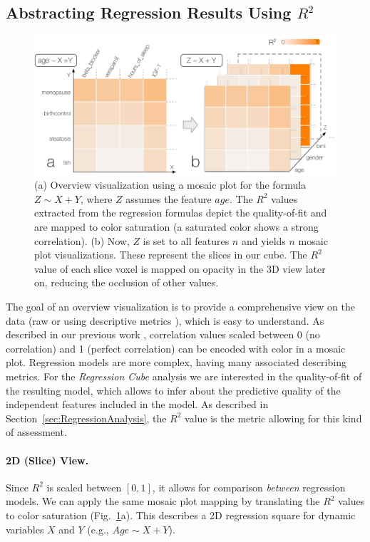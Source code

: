 \documentclass[journal]{style/vgtc} 			          %
\begin{document}
\subsection{Abstracting Regression Results Using $R^2$}
\begin{figure}[htb]
 \centering
 \includegraphics[width=1.0\linewidth]{figures/cube}
 \caption{
 (a) Overview visualization using a mosaic plot for the formula $Z \sim X + Y$, where $Z$ assumes the feature $age$.
 The $R^2$ values extracted from the regression formulas depict the quality-of-fit and are mapped to color saturation (a saturated color shows a strong correlation).
 (b) Now, $Z$ is set to all features $n$ and yields $n$ mosaic plot visualizations.
 These represent the slices in our cube.
 The $R^2$ value of each slice voxel is mapped on opacity in the 3D view later on, reducing the occlusion of other values.
 }
  \label{fig:Cube}
\end{figure}
The goal of an overview visualization is to provide a comprehensive view on the data (raw or using descriptive metrics \cite{Bertini}), which is easy to understand.
As described in our previous work \cite{Klemm2014VIS}, correlation values scaled between 0 (no correlation) and 1 (perfect correlation) can be encoded with color in a mosaic plot.
Regression models are more complex, having many associated describing metrics.
For the \emph{Regression Cube} analysis we are interested in the quality-of-fit of the resulting model, which allows to infer about the predictive quality of the independent features included in the model.
As described in Section~\ref{sec:RegressionAnalysis}, the $R^2$ value is the metric allowing for this kind of assessment.
\paragraph{2D (Slice) View.}
Since $R^2$ is scaled between $[0, 1]$, it allows for comparison \emph{between} regression models.
We can apply the same mosaic plot mapping by translating the $R^2$ values to color saturation (Fig.~\ref{fig:Cube}a).
This describes a 2D regression square for dynamic variables $X$ and $Y$ (e.g., $Age \sim X + Y$).
\end{document}
